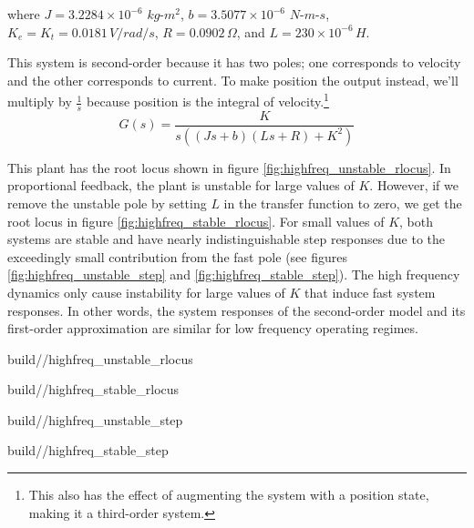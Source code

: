 where $J = 3.2284 \times 10^{-6}$ $kg$-$m^2$, $b = 3.5077 \times 10^{-6}$
$N$-$m$-$s$, $K_e = K_t = 0.0181 \,V/rad/s$, $R = 0.0902 \,\Omega$, and
$L = 230 \times 10^{-6} \,H$.

This system is second-order because it has two poles; one corresponds to
velocity and the other corresponds to current. To make position the output
instead, we'll multiply by $\frac{1}{s}$ because position is the integral of
velocity.\footnote{This also has the effect of augmenting the system with a
position state, making it a third-order system.}
\begin{equation*}
  G(s) = \frac{K}{s((Js + b)(Ls + R) + K^2)}
\end{equation*}

This \gls{plant} has the root locus shown in figure
\ref{fig:highfreq_unstable_rlocus}. In proportional feedback, the \gls{plant} is
unstable for large values of $K$. However, if we remove the unstable pole by
setting $L$ in the transfer function to zero, we get the root locus in figure
\ref{fig:highfreq_stable_rlocus}. For small values of $K$, both \glspl{system}
are stable and have nearly indistinguishable \glspl{step response} due to the
exceedingly small contribution from the fast pole (see figures
\ref{fig:highfreq_unstable_step} and \ref{fig:highfreq_stable_step}). The high
frequency dynamics only cause instability for large values of $K$ that induce
fast \glspl{system response}. In other words, the \glspl{system response} of the
second-order model and its first-order approximation are similar for low
frequency operating regimes.
\begin{bookfigure}
  \begin{minisvg}{2}{build/\chapterpath/highfreq_unstable_rlocus}
    \caption{Root locus of second-order DC brushed motor plant augmented with
      position}
    \label{fig:highfreq_unstable_rlocus}
  \end{minisvg}
  \hfill
  \begin{minisvg}{2}{build/\chapterpath/highfreq_stable_rlocus}
    \caption{Root locus of first-order DC brushed motor plant augmented with
      position}
    \label{fig:highfreq_stable_rlocus}
  \end{minisvg}
\end{bookfigure}
\begin{bookfigure}
  \begin{minisvg}{2}{build/\chapterpath/highfreq_unstable_step}
    \caption{Step response of second-order DC brushed motor plant augmented with
      position}
    \label{fig:highfreq_unstable_step}
  \end{minisvg}
  \hfill
  \begin{minisvg}{2}{build/\chapterpath/highfreq_stable_step}
    \caption{Step response of first-order DC brushed motor plant augmented with
      position}
    \label{fig:highfreq_stable_step}
  \end{minisvg}
\end{bookfigure}

